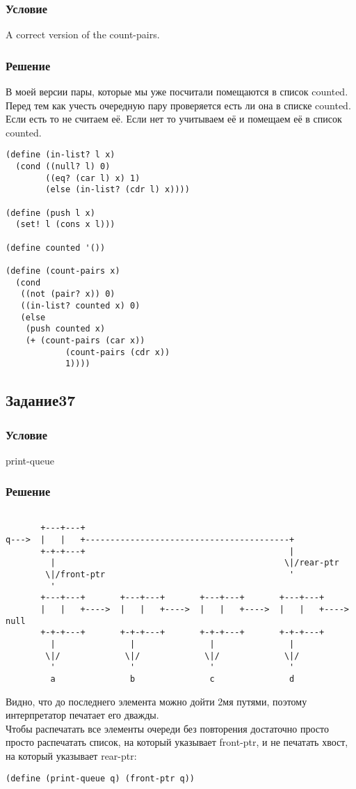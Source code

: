 \documentclass[10pt,a4paper]{article}
\begin{document}
\subsubsection*{Условие}
A correct version of the count-pairs.
\subsubsection*{Решение}
В моей версии пары, которые мы уже посчитали помещаются в список
counted. Перед тем как учесть очередную пару проверяется есть ли она
в списке counted. Если есть то не считаем её. Если нет то учитываем её
и помещаем её в список counted.
\begin{lstlisting}
(define (in-list? l x)
  (cond ((null? l) 0)
        ((eq? (car l) x) 1)
        (else (in-list? (cdr l) x))))

(define (push l x)
  (set! l (cons x l)))

(define counted '())

(define (count-pairs x)
  (cond
   ((not (pair? x)) 0)
   ((in-list? counted x) 0)
   (else
    (push counted x)
    (+ (count-pairs (car x))
            (count-pairs (cdr x))
            1))))
\end{lstlisting}

\subsection*{Задание37}
\subsubsection*{Условие}
print-queue
\subsubsection*{Решение}
\begin{lstlisting}

       +---+---+
q--->  |   |   +-----------------------------------------+
       +-+-+---+                                         |
         |                                              \|/rear-ptr
        \|/front-ptr                                     '
         '
       +---+---+       +---+---+       +---+---+       +---+---+
       |   |   +---->  |   |   +---->  |   |   +---->  |   |   +---->  null
       +-+-+---+       +-+-+---+       +-+-+---+       +-+-+---+
         |               |               |               |
        \|/             \|/             \|/             \|/
         '               '               '               '
         a               b               c               d

\end{lstlisting}
Видно, что до последнего элемента можно дойти 2мя путями, поэтому
интерпретатор печатает его дважды. \\
Чтобы распечатать все элементы очереди без повторения достаточно
просто просто распечатать список, на который указывает front-ptr, и не
печатать хвост, на который указывает rear-ptr:
\begin{lstlisting}
(define (print-queue q) (front-ptr q))
\end{lstlisting}
\end{document}
